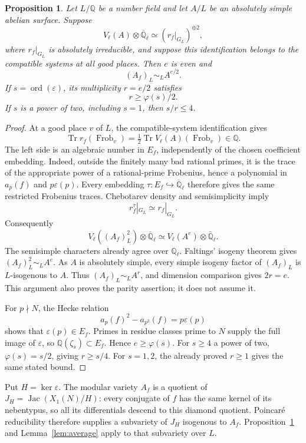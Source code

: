 \documentclass[11pt,a4paper]{article}
\newtheorem{proposition}[theorem]{Proposition}
\newcommand{\Q}{\mathbb Q}
\DeclareMathOperator{\Tr}{Tr}
\DeclareMathOperator{\ord}{ord}
\begin{document}
\begin{proposition}\label{prop:multiplicity}
Let \(L/\Q\) be a number field and let \(A/L\) be an absolutely
simple abelian surface. Suppose
\[
 V_\ell(A)\otimes\overline{\Q}_\ell
       \simeq (r_f|_{G_L})^{\oplus2},
\]
where \(r_f|_{G_L}\) is absolutely irreducible, and suppose this
identification belongs to the compatible systems at all good places.
Then \(e\) is even and
\[
                         (A_f)_L\sim_L A^{e/2}.
\]
If \(s=\ord(\varepsilon)\), its multiplicity \(r=e/2\) satisfies
\[
                     r\ge \varphi(s)/2.
\]
If \(s\) is a power of two, including \(s=1\), then \(s/r\le4\).
\end{proposition}
\begin{proof}
At a good place \(v\) of \(L\), the compatible-system identification gives
\[
 \Tr r_f(\operatorname{Frob}_v)
       =\tfrac12\Tr V_\ell(A)(\operatorname{Frob}_v)\in\Q.
\]
The left side is an algebraic number in \(E_f\), independently of
the chosen coefficient embedding. Indeed, outside the finitely
many bad rational primes, it is the trace of the appropriate
power of a rational-prime Frobenius, hence a polynomial in
\(a_p(f)\) and \(p\varepsilon(p)\).
Every embedding \(\tau:E_f\hookrightarrow\overline{\Q}_\ell\)
therefore gives the same restricted Frobenius traces.
Chebotarev density and semisimplicity imply
\[
                         r_f^\tau|_{G_L}\simeq r_f|_{G_L}.
\]
Consequently
\[
 V_\ell((A_f)_L^2)\otimes\overline{\Q}_\ell
       \simeq V_\ell(A^e)\otimes\overline{\Q}_\ell.
\]
The semisimple characters already agree over \(\Q_\ell\).
Faltings' isogeny theorem gives \((A_f)_L^2\sim_L A^e\).
As \(A\) is absolutely simple, every simple isogeny factor of
\((A_f)_L\) is \(L\)-isogenous to \(A\).
Thus \((A_f)_L\sim_L A^r\), and dimension comparison gives \(2r=e\).
This argument also proves the parity assertion; it does not assume it.

For \(p\nmid N\), the Hecke relation
\[
                  a_p(f)^2-a_{p^2}(f)=p\varepsilon(p)
\]
shows that \(\varepsilon(p)\in E_f\). Primes in residue classes
prime to \(N\) supply the full image of \(\varepsilon\), so
\(\Q(\zeta_s)\subset E_f\). Hence \(e\ge\varphi(s)\).
For \(s\ge4\) a power of two, \(\varphi(s)=s/2\), giving
\(r\ge s/4\). For \(s=1,2\), the already proved \(r\ge1\)
gives the same stated bound.
\end{proof}

Put \(H=\ker\varepsilon\). The modular variety \(A_f\) is a
quotient of \(J_H=\operatorname{Jac}(X_1(N)/H)\): every conjugate
of \(f\) has the same kernel of its nebentypus, so all its
differentials descend to this diamond quotient. Poincar\'e
reducibility therefore supplies a subvariety of \(J_H\) isogenous
to \(A_f\). Proposition~\ref{prop:multiplicity} and
Lemma~\ref{lem:average} apply to that subvariety over \(L\).
\end{document}
